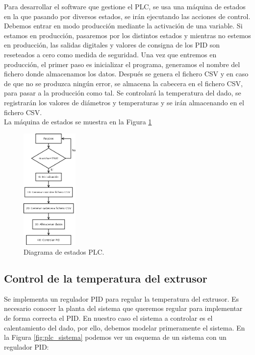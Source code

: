 Para desarrollar el software que gestione el PLC, se usa una máquina de estados en la que pasando por diversos estados, se irán ejecutando las acciones de control. Debemos entrar en modo producción mediante la activación de una variable. Si estamos en producción, pasaremos por los distintos estados y mientras no estemos en producción, las salidas digitales y valores de consigna de los PID son reseteados a cero como medida de seguridad. Una vez que entremos en producción, el primer paso es inicializar el programa, generamos el nombre del fichero donde almacenamos los datos. Después se genera el fichero CSV y en caso de que no se produzca ningún error, se almacena la cabecera en el fichero CSV, para pasar a la producción como tal. Se controlará la temperatura del dado, se registrarán los valores de diámetros y temperaturas y se irán almacenando en el fichero CSV.\\

La máquina de estados se muestra en la Figura \ref{fig:plc_estados}

\begin{figure}[H]
    \centering
    \includegraphics[width=0.25\textwidth]{images/PLC/diagrama.png}
    \caption[Diagrama de estados PLC.]{Diagrama de estados PLC.}
    \label{fig:plc_estados}
\end{figure}

\subsection{Control de la temperatura del extrusor}
\label{sec:plc_PID}

Se implementa un regulador PID para regular la temperatura del extrusor. Es necesario conocer la planta del sistema que queremos regular para implementar de forma correcta el PID. En nuestro caso el sistema a controlar es el calentamiento del dado, por ello, debemos modelar primeramente el sistema. En la Figura \ref{fig:plc_sistema} podemos ver un esquema de un sistema con un regulador PID:

